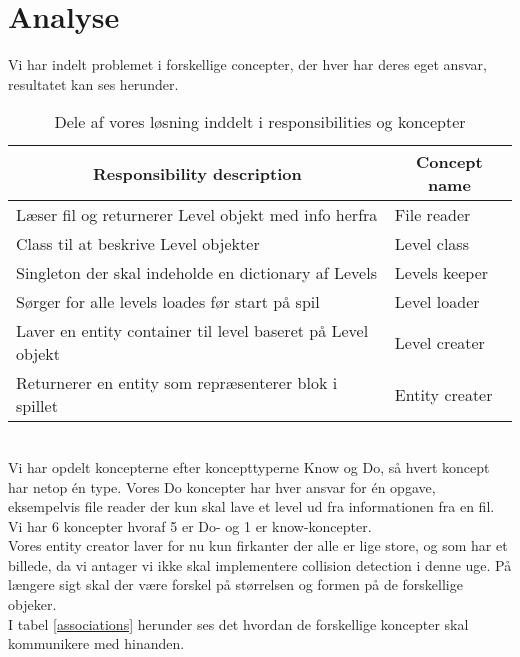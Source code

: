 \section{Analyse}
Vi har indelt problemet i forskellige concepter, der hver har deres eget ansvar, resultatet kan ses herunder.\\
\begin{table}[!h]
\centering
\begin{tabular}{|l|l|}
\hline
\multicolumn{1}{|c|}{\textbf{Responsibility description}}            & \multicolumn{1}{c|}{\textbf{Concept name}} \\ \hline
Læser fil og returnerer Level objekt med info herfra        & File reader                       \\ \hline
Class til at beskrive Level objekter                        & Level class                       \\ \hline
Singleton der skal indeholde en dictionary af Levels        & Levels keeper                     \\ \hline
Sørger for alle levels loades før start på spil             & Level loader                      \\ \hline
Laver en entity container til level baseret på Level objekt & Level creater                     \\ \hline
Returnerer en entity som repræsenterer blok i spillet       & Entity creater                    \\ \hline
\end{tabular}
\caption{Dele af vores løsning inddelt i responsibilities og koncepter}
\label{responsibilities}
\end{table}\\
Vi har opdelt koncepterne efter koncepttyperne Know og Do, så hvert koncept har netop én type. Vores Do koncepter har hver ansvar for én opgave, eksempelvis file reader der kun skal lave et level ud fra informationen fra en fil. Vi har 6 koncepter hvoraf 5 er Do- og 1 er know-koncepter.\\
Vores entity creator laver for nu kun firkanter der alle er lige store, og som har et billede, da vi antager vi ikke skal implementere collision detection i denne uge. På længere sigt skal der være forskel på størrelsen og formen på de forskellige objeker.\\
I tabel \ref{associations} herunder ses det hvordan de forskellige koncepter skal kommunikere med hinanden.
